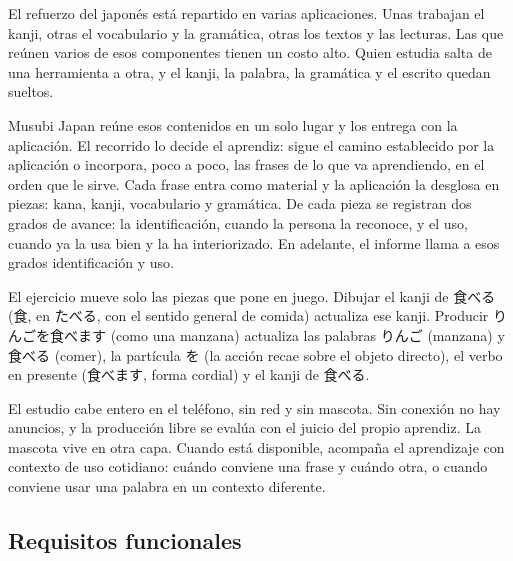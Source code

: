 \documentclass[11pt]{article}
\newcommand{\jp}[1]{{\cjk #1}}
\begin{document}
El refuerzo del japonés está repartido en varias aplicaciones. Unas trabajan el kanji, otras el vocabulario y la gramática, otras los textos y las lecturas. Las que reúnen varios de esos componentes tienen un costo alto. Quien estudia salta de una herramienta a otra, y el kanji, la palabra, la gramática y el escrito quedan sueltos.

Musubi Japan reúne esos contenidos en un solo lugar y los entrega con la aplicación. El recorrido lo decide el aprendiz: sigue el camino establecido por la aplicación o incorpora, poco a poco, las frases de lo que va aprendiendo, en el orden que le sirve. Cada frase entra como material y la aplicación la desglosa en piezas: kana, kanji, vocabulario y gramática. De cada pieza se registran dos grados de avance: la identificación, cuando la persona la reconoce, y el uso, cuando ya la usa bien y la ha interiorizado. En adelante, el informe llama a esos grados identificación y uso.

El ejercicio mueve solo las piezas que pone en juego. Dibujar el kanji de \jp{食べる} (\jp{食}, en \jp{たべる}, con el sentido general de comida) actualiza ese kanji. Producir \jp{りんごを食べます} (como una manzana) actualiza las palabras \jp{りんご} (manzana) y \jp{食べる} (comer), la partícula \jp{を} (la acción recae sobre el objeto directo), el verbo en presente (\jp{食べます}, forma cordial) y el kanji de \jp{食べる}.

El estudio cabe entero en el teléfono, sin red y sin mascota. Sin conexión no hay anuncios, y la producción libre se evalúa con el juicio del propio aprendiz. La mascota vive en otra capa. Cuando está disponible, acompaña el aprendizaje con contexto de uso cotidiano: cuándo conviene una frase y cuándo otra, o cuando conviene usar una palabra en un contexto diferente.

\subsection{Requisitos funcionales}
\end{document}
